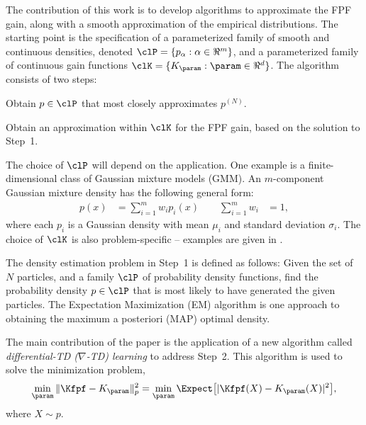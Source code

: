 The contribution of this work is to develop algorithms to approximate the FPF gain, along with a smooth approximation of the empirical distributions.  The starting point is the specification of a parameterized family  of smooth and continuous densities, denoted  $\clP = \{ p_\alpha : \alpha\in\Re^m\}$,  and a parameterized family of continuous gain functions $\clK = \{K_\param : \param\in\Re^d\}$.
The algorithm consists of two steps:
\begin{arabnum}
	\item Obtain $p\in\clP $ that most closely approximates $p^{(N)}$.
	\item  Obtain an approximation within $\clK$ for the FPF gain, based on the solution to Step~1.
\end{arabnum}
The choice of $\clP$ will depend on the application.
One example is a finite-dimensional class of Gaussian mixture models (GMM). An $m$-component Gaussian mixture density has the following general form:
\begin{equation*}
\begin{aligned}
p(x)& = \sum_{i=1}^{m} w_{i} p_{i}(x) \qquad  \sum_{i=1}^{m} w_{i} &=1 ,
\label{gaussian_mix}
\end{aligned}
\end{equation*}
\noindent
where each $p_{i}$ is a Gaussian density with mean $\mu_{i}$ and standard deviation $\sigma_{i}$.
The choice of $\clK$ is also problem-specific -- examples are given in .

The density estimation problem in Step~1 is defined as follows: Given the set of $N$ particles, and a family $\clP $ of probability density functions,  find the probability density $p \in \clP $ that is most likely to have generated the given particles.  The
Expectation Maximization (EM) algorithm is one approach to obtaining the maximum a posteriori (MAP) optimal density.

The main contribution of the paper is the application of a new algorithm called \textit{differential-TD ($\nabla$-TD) learning} to address Step~2.   This algorithm is used to solve the minimization problem,
\begin{equation}
\min_{\param}\|\Kfpf - K_\param\|_p^{2}
=
\min_{\param} \Expect\bigl[   | \Kfpf (X) - K_\param(X) |^2 \bigr],
\label{e:gradTDgoal}
\end{equation}
where $X \sim p$.

